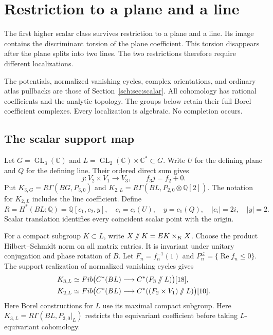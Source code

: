 \chapter{Restriction to a plane and a line}
\label{cr21:ch}

The first higher scalar class survives restriction to a plane and a line.
Its image contains the discriminant torsion of the plane coefficient.
This torsion disappears after the plane splits into two lines.
The two restrictions therefore require different localizations.

The potentials, normalized vanishing cycles, complex orientations, and
ordinary atlas pullbacks are those of Section~\ref{sch:sec:scalar}.
All cohomology has rational coefficients and the analytic topology.
The groups below retain their full Borel coefficient complexes.
Every localization is algebraic. No completion occurs.

\section{The scalar support map}
\label{cr21:sec:support}

Let $G=\operatorname{GL}_3(\mathbb C)$ and
$L=\operatorname{GL}_2(\mathbb C)\times\mathbb C^*\subset G$.
Write $U$ for the defining plane and $Q$ for the defining line.
Their ordered direct sum gives
\[
 j:V_2\times V_1\longrightarrow V_3,
 \qquad f_3j=f_2+0.
\]
Put $K_{3,G}=R\Gamma(BG,P_{3,0})$ and
$K_{2,L}=R\Gamma(BL,P_{2,0}\otimes\mathbb Q[2])$.
The notation for $K_{2,L}$ includes the line coefficient.
Define
\[
 R=H^*(BL;\mathbb Q)=\mathbb Q[c_1,c_2,y],
 \quad c_i=c_i(U),\quad y=c_1(Q),
 \quad |c_i|=2i,\quad |y|=2.
\]
Scalar translation identifies every coincident scalar point with the origin.

For a compact subgroup $K\subset L$, write
$X\mathbin{/\mkern-6mu/}K=EK\times_KX$.
Choose the product Hilbert--Schmidt norm on all matrix entries.
It is invariant under unitary conjugation and phase rotation of $B$.
Let $F_n=f_n^{-1}(1)$ and
$P_n^{\leq}=\{\operatorname{Re}f_n\leq0\}$.
The support realization of normalized vanishing cycles gives
\begin{equation}
 \begin{aligned}
 K_{3,L}&\simeq
   \operatorname{Fib}\bigl(C^*(BL)\longrightarrow
                      C^*(F_3\mathbin{/\mkern-6mu/}L)\bigr)[18],\\
 K_{2,L}&\simeq
   \operatorname{Fib}\bigl(C^*(BL)\longrightarrow
             C^*((F_2\times V_1)\mathbin{/\mkern-6mu/}L)\bigr)[10].
 \end{aligned}
 \label{cr21:eq:fibres}
\end{equation}
Here Borel constructions for $L$ use its maximal compact subgroup.
Here $K_{3,L}=R\Gamma(BL,P_{3,0}|_L)$ restricts the equivariant
coefficient before taking $L$-equivariant cohomology.

